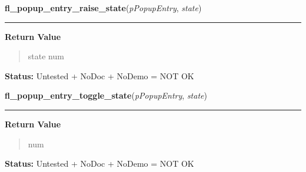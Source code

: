     \label{xformslib:flpopup:fl_popup_entry_raise_state}

    \vspace{0.5ex}

\hspace{.8\funcindent}\begin{boxedminipage}{\funcwidth}

    \raggedright \textbf{fl\_popup\_entry\_raise\_state}(\textit{pPopupEntry}, \textit{state})

    \vspace{-1.5ex}

    \rule{\textwidth}{0.5\fboxrule}
\setlength{\parskip}{2ex}
\setlength{\parskip}{1ex}
      \textbf{Return Value}
    \vspace{-1ex}

      \begin{quote}
      state num

      \end{quote}

\textbf{Status:} Untested + NoDoc + NoDemo = NOT OK



    \end{boxedminipage}

    \label{xformslib:flpopup:fl_popup_entry_toggle_state}

    \vspace{0.5ex}

\hspace{.8\funcindent}\begin{boxedminipage}{\funcwidth}

    \raggedright \textbf{fl\_popup\_entry\_toggle\_state}(\textit{pPopupEntry}, \textit{state})

    \vspace{-1.5ex}

    \rule{\textwidth}{0.5\fboxrule}
\setlength{\parskip}{2ex}
\setlength{\parskip}{1ex}
      \textbf{Return Value}
    \vspace{-1ex}

      \begin{quote}
      num

      \end{quote}

\textbf{Status:} Untested + NoDoc + NoDemo = NOT OK



    \end{boxedminipage}


